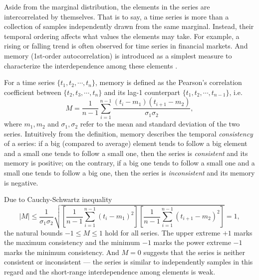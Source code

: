Aside from the marginal distribution, the elements in the series are intercorrelated by themselves. That is to say, a time series is more than a collection of samples independently drawn from the same marginal. Instead, their temporal ordering affects what values the elements may take. For example, a rising or falling trend is often observed for time series in financial markets. 
And memory (1st-order autocorrelation) is introduced as a simplest measure to characterize the interdependence among these elements \cite{Goh2008}. 

For a time series $ \{t_1, t_2, \cdots, t_{n}\} $, memory is defined as the Pearson's correlation coefficient between $ \{t_{2}, t_{3}, \cdots, t_{n} \}$ and its lag-1 counterpart $ \{t_{1}, t_{2}, \cdots, t_{n-1}\} $, i.e.
\begin{equation}
	M = \frac{1}{n-1} \sum_{i=1}^{n-1} \frac{(t_i - m_1)(t_{i+1} - m_2)}{\sigma_1 \sigma_2},
\end{equation}
where $ m_1, m_2 $  and $ \sigma_1, \sigma_2 $ refer to the mean and standard deviation of the two series. Intuitively from the definition, memory describes the temporal \textit{consistency} of a series: if a big (compared to average) element tends to follow a big element and a small one tends to follow a small one, then the series is \textit{consistent} and its memory is positive; on the contrary, if a big one tends to follow a small one and a small one tends to follow a big one, then the series is \textit{inconsistent} and its memory is negative. 

Due to Cauchy-Schwartz inequality
\begin{equation}
	\left\vert M \right\vert \leq \frac{1}{\sigma_1 \sigma_2} \sqrt{\left[ \frac{1}{n-1} \sum_{i=1}^{n-1} (t_i - m_1)^2  \right] \left[ \frac{1}{n-1} \sum_{i=1}^{n-1} (t_{i+1} - m_2)^2 \right]} = 1,
\end{equation}
the natural bounds $ -1 \leq M \leq 1 $ hold for all series. The upper extreme $ +1 $ marks the maximum consistency and the minimum $ -1 $ marks the power extreme $ -1 $ marks the minimum consistency. And $ M=0 $ suggests that the series is neither consistent or inconsistent --- the series is similar to independently samples in this regard and the short-range interdependence among elements is weak.

